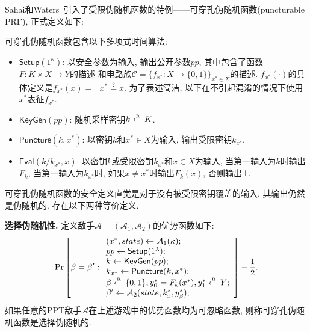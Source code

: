 Sahai和Waters~\cite{SW-STOC-2014}引入了受限伪随机函数的特例——可穿孔伪随机函数(puncturable PRF), 正式定义如下: 
\begin{definition} 
可穿孔伪随机函数包含以下多项式时间算法: 
\begin{itemize}
\item $\mathsf{Setup}(1^\kappa)$: 以安全参数为输入, 输出公开参数$pp$, 其中包含了函数$F: K \times X \rightarrow Y$的描述
    和电路族$\mathcal{C} = \{f_{x^*}: X \rightarrow \{0,1\}\}_{x^* \in X}$的描述.  
    $f_{x^*}(\cdot)$的具体定义是$f_{x^*}(x) = \neg x^* \stackrel{?}{=}x$. 为了表述简洁, 以下在不引起混淆的情况下使用$x^*$表征$f_{x^*}$.   

\item $\mathsf{KeyGen}(pp)$: 随机采样密钥$k \xleftarrow{\textup{\tiny R}} K$. 

\item $\mathsf{Puncture}(k, x^*)$: 以密钥$k$和$x^* \in X$为输入, 输出受限密钥$k_{x^*}$. 

\item $\mathsf{Eval}(k/k_{x^*}, x)$: 以密钥$k$或受限密钥$k_{x^*}$和$x \in X$为输入, 当第一输入为$k$时输出$F_k$, 
    当第一输入为$k_{x^*}$时, 如果$x \neq x^*$时输出$F_k(x)$, 否则输出$\bot$. 
\end{itemize}
\end{definition}

可穿孔伪随机函数的安全定义直觉是对于没有被受限密钥覆盖的输入, 其输出仍然是伪随机的. 存在以下两种等价定义. 
\begin{trivlist}
\item \textbf{选择伪随机性.} 定义敌手$\mathcal{A} = (\mathcal{A}_1, \mathcal{A}_2)$的优势函数如下: 
\begin{displaymath}
    \Pr \left[\beta = \beta': 
    \begin{array}{l}
        (x^*, state) \leftarrow \mathcal{A}_1(\kappa);\\
        pp \leftarrow \mathsf{Setup}(1^\lambda); \\
        k \leftarrow \mathsf{KeyGen}(pp); \\
        k_{x^*} \leftarrow \mathsf{Puncture}(k, x^*);\\ 
        \beta \xleftarrow{\textup{\tiny R}} \{0, 1\}, y_0^* = F_k(x^*), y_1^* \xleftarrow{\textup{\tiny R}} Y; \\
        \beta' \leftarrow \mathcal{A}_2(state, k_x^*, y_\beta^*);
    \end{array}
    \right] - \frac{1}{2}.
\end{displaymath}
如果任意的PPT敌手$\mathcal{A}$在上述游戏中的优势函数均为可忽略函数, 则称可穿孔伪随机函数是选择伪随机的. 
\end{trivlist}

